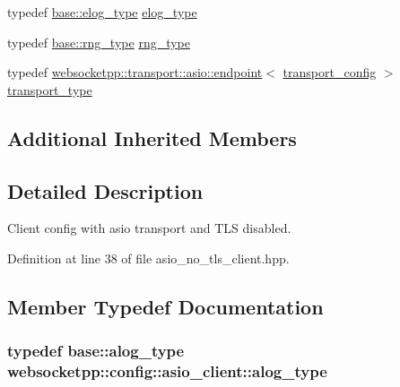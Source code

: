 \begin{DoxyCompactItemize}
\item 
typedef \hyperlink{structwebsocketpp_1_1config_1_1core__client_a24f1bae9e8a92bf7950153ed39eaffb8}{base\+::elog\+\_\+type} \hyperlink{structwebsocketpp_1_1config_1_1asio__client_abbef282de8c085b57d8f6780f0187a1d}{elog\+\_\+type}
\item 
typedef \hyperlink{structwebsocketpp_1_1config_1_1core__client_adacb3a0ec249a2dea11871f299cf660f}{base\+::rng\+\_\+type} \hyperlink{structwebsocketpp_1_1config_1_1asio__client_a02b4c4dd005aa41d70a70a60e3929d37}{rng\+\_\+type}
\item 
typedef \hyperlink{classwebsocketpp_1_1transport_1_1asio_1_1endpoint}{websocketpp\+::transport\+::asio\+::endpoint}$<$ \hyperlink{structwebsocketpp_1_1config_1_1asio__client_1_1transport__config}{transport\+\_\+config} $>$ \hyperlink{structwebsocketpp_1_1config_1_1asio__client_a0995b7dc42e350f8caa99b409b2cb0a7}{transport\+\_\+type}
\end{DoxyCompactItemize}
\subsection*{Additional Inherited Members}


\subsection{Detailed Description}
Client config with asio transport and T\+L\+S disabled. 

Definition at line 38 of file asio\+\_\+no\+\_\+tls\+\_\+client.\+hpp.



\subsection{Member Typedef Documentation}
\hypertarget{structwebsocketpp_1_1config_1_1asio__client_af6deeb2d0492bb8680b4e030fd201185}{}
\subsubsection[{alog\+\_\+type}]{\setlength{\rightskip}{0pt plus 5cm}typedef {\bf base\+::alog\+\_\+type} {\bf websocketpp\+::config\+::asio\+\_\+client\+::alog\+\_\+type}}\label{structwebsocketpp_1_1config_1_1asio__client_af6deeb2d0492bb8680b4e030fd201185}



